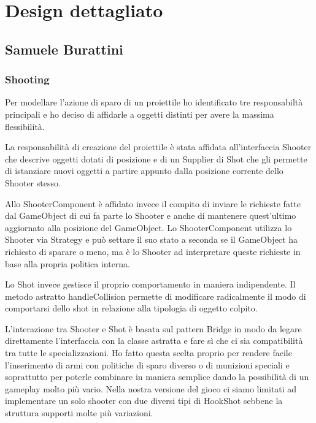 \documentclass[a4paper,12pt]{report}
\begin{document}
\section{Design dettagliato}

\subsection*{Samuele Burattini}

\subsubsection*{Shooting}

Per modellare l'azione di sparo di un proiettile ho identificato tre responsabiltà principali e ho deciso di affidarle a oggetti distinti per avere la massima flessibilità.

La responsabilità di creazione del proiettile è stata affidata all'interfaccia Shooter che descrive oggetti dotati di posizione e di un Supplier di Shot che gli permette di istanziare nuovi oggetti a partire appunto dalla posizione corrente dello Shooter stesso.

Allo ShooterComponent è affidato invece il compito di inviare le richieste fatte dal GameObject di cui fa parte lo Shooter e anche di mantenere quest'ultimo aggiornato alla posizione del GameObject.
Lo ShooterComponent utilizza lo Shooter via Strategy e può settare il suo stato a seconda se il GameObject ha richiesto di sparare o meno, ma è lo Shooter ad interpretare queste richieste in base alla propria politica interna.

Lo Shot invece gestisce il proprio comportamento in maniera indipendente.
Il metodo astratto handleCollision permette di modificare radicalmente il modo di comportarsi dello shot in relazione alla tipologia di oggetto colpito.

L'interazione tra Shooter e Shot è basata sul pattern Bridge in modo da legare direttamente l'interfaccia con la classe astratta e fare sì che ci sia compatibilità tra tutte le specializzazioni.
Ho fatto questa scelta proprio per rendere facile l'inserimento di armi con politiche di sparo diverso o di munizioni speciali e soprattutto per poterle combinare in maniera semplice dando la possibilità di un gameplay molto più vario.
Nella nostra versione del gioco ci siamo limitati ad implementare un solo shooter con due diversi tipi di HookShot sebbene la struttura supporti molte più variazioni.
\end{document}
